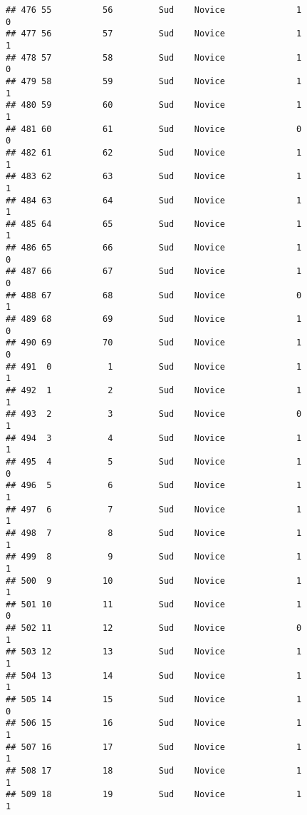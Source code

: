 \documentclass[
]{article}
\begin{document}
\begin{verbatim}
## 476 55          56         Sud    Novice              1                 0
## 477 56          57         Sud    Novice              1                 1
## 478 57          58         Sud    Novice              1                 0
## 479 58          59         Sud    Novice              1                 1
## 480 59          60         Sud    Novice              1                 1
## 481 60          61         Sud    Novice              0                 0
## 482 61          62         Sud    Novice              1                 1
## 483 62          63         Sud    Novice              1                 1
## 484 63          64         Sud    Novice              1                 1
## 485 64          65         Sud    Novice              1                 1
## 486 65          66         Sud    Novice              1                 0
## 487 66          67         Sud    Novice              1                 0
## 488 67          68         Sud    Novice              0                 1
## 489 68          69         Sud    Novice              1                 0
## 490 69          70         Sud    Novice              1                 0
## 491  0           1         Sud    Novice              1                 1
## 492  1           2         Sud    Novice              1                 1
## 493  2           3         Sud    Novice              0                 1
## 494  3           4         Sud    Novice              1                 1
## 495  4           5         Sud    Novice              1                 0
## 496  5           6         Sud    Novice              1                 1
## 497  6           7         Sud    Novice              1                 1
## 498  7           8         Sud    Novice              1                 1
## 499  8           9         Sud    Novice              1                 1
## 500  9          10         Sud    Novice              1                 1
## 501 10          11         Sud    Novice              1                 0
## 502 11          12         Sud    Novice              0                 1
## 503 12          13         Sud    Novice              1                 1
## 504 13          14         Sud    Novice              1                 1
## 505 14          15         Sud    Novice              1                 0
## 506 15          16         Sud    Novice              1                 1
## 507 16          17         Sud    Novice              1                 1
## 508 17          18         Sud    Novice              1                 1
## 509 18          19         Sud    Novice              1                 1

\end{verbatim}
\end{document}
